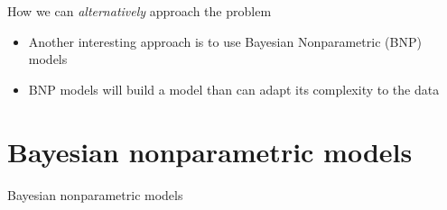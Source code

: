\documentclass[handout]{beamer}
\begin{document}
\begin{frame}{How we can \textit{alternatively} approach the problem}
	\begin{itemize}
        \item Another interesting approach is to use Bayesian Nonparametric (BNP) models
        \item BNP models will build a model than can adapt its complexity to the data
	\end{itemize}
\end{frame}

\section{Bayesian nonparametric models}
\begin{frame}{Bayesian nonparametric models}
    \begin{figure}[H]
        \centering
        
    \end{figure}
\end{frame}
\end{document}
